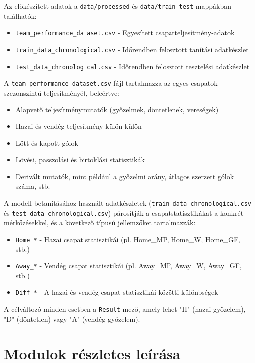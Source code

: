 Az előkészített adatok a \texttt{data/processed} és \texttt{data/train\_test} mappákban találhatók:

\begin{itemize}
    \item \texttt{team\_performance\_dataset.csv} - Egyesített csapatteljesítmény-adatok
    \item \texttt{train\_data\_chronological.csv} - Időrendben felosztott tanítási adatkészlet
    \item \texttt{test\_data\_chronological.csv} - Időrendben felosztott tesztelési adatkészlet
\end{itemize}

A \texttt{team\_performance\_dataset.csv} fájl tartalmazza az egyes csapatok szezonszintű teljesítményét, beleértve:
\begin{itemize}
    \item Alapvető teljesítménymutatók (győzelmek, döntetlenek, vereségek)
    \item Hazai és vendég teljesítmény külön-külön
    \item Lőtt és kapott gólok
    \item Lövési, passzolási és birtoklási statisztikák
    \item Derivált mutatók, mint például a győzelmi arány, átlagos szerzett gólok száma, stb.
\end{itemize}

A modell betanításához használt adatkészletek (\texttt{train\_data\_chronological.csv} és \texttt{test\_data\_chronological.csv}) párosítják a csapatstatisztikákat a konkrét mérkőzésekkel, és a következő típusú jellemzőket tartalmazzák:
\begin{itemize}
    \item \texttt{Home\_*} - Hazai csapat statisztikái (pl. Home\_MP, Home\_W, Home\_GF, stb.)
    \item \texttt{Away\_*} - Vendég csapat statisztikái (pl. Away\_MP, Away\_W, Away\_GF, stb.)
    \item \texttt{Diff\_*} - A hazai és vendég csapat statisztikái közötti különbségek
\end{itemize}

A célváltozó minden esetben a \texttt{Result} mező, amely lehet "H" (hazai győzelem), "D" (döntetlen) vagy "A" (vendég győzelem).

\section{Modulok részletes leírása}


